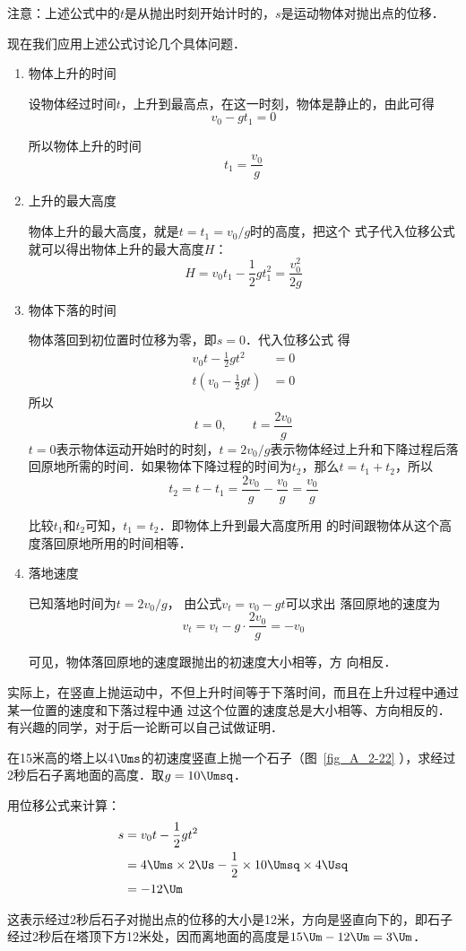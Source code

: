 注意：上述公式中的$t$是从抛出时刻开始计时的，$s$是运动物体对抛出点的位移．

现在我们应用上述公式讨论几个具体问题．
\begin{enumerate}[(1)]
	\item  物体上升的时间
	
	设物体经过时间$t$，上升到最高点，在这一时刻，物体是静止的，由此可得
	\[v_0-gt_1=0 \]
	
	所以物体上升的时间
	\[t_1=\frac{v_0}{g} \]
	
	\item 上升的最大高度
	
	物体上升的最大高度，就是$t=t_1=v_0/g$时的高度，把这个
	式子代入位移公式就可以得出物体上升的最大高度$H$：
	\[H=v_0t_1-\frac{1}{2}gt_1^2=\frac{v^2_0}{2g} \]
	
	\item 物体下落的时间
	
	物体落回到初位置时位移为零，即$s=0$．代入位移公式
	得
	\[\begin{split}
	v_0 t-\frac{1}{2}gt^2&=0\\
	t\left(v_0-\frac{1}{2}gt\right)&=0
	\end{split} \]
	所以
	\[t=0,\qquad t=\frac{2v_0}{g} \]
	$t=0$表示物体运动开始时的时刻，$t=2v_0/g$表示物体经过上升和下降过程后落回原地所需的时间．如果物体下降过程的时间为$t_2$，那么$t=t_1+t_2$，所以
	\[t_2=t-t_1=\frac{2v_0}{g}-\frac{v_0}{g}=\frac{v_0}{g} \]
	
	比较$t_1$和$t_2$可知，$t_1=t_2$．即物体上升到最大高度所用
	的时间跟物体从这个高度落回原地所用的时间相等．
	
	\item 落地速度
	
	已知落地时间为$t=2v_0/g$，
	由公式$v_t=v_0-gt$可以求出
	落回原地的速度为
	\[v_t=v_t-g\cdot \frac{2v_0}{g}=-v_0 \]
	
	可见，物体落回原地的速度跟抛出的初速度大小相等，方
	向相反．
\end{enumerate}

实际上，在竖直上抛运动中，不但上升时间等于下落时间，而且在上升过程中通过某一位置的速度和下落过程中通
过这个位置的速度总是大小相等、方向相反的．有兴趣的同学，对于后一论断可以自己试做证明．

\begin{example}
在15米高的塔上以4$\Ums$的初速度竖直上抛一个石子（图~\ref{fig_A_2-22} ），求经过2秒后石子离地面的高度．取$g=10\Umsq$．
\end{example}

\begin{solution}
用位移公式来计算：
\[\begin{split}
s&=v_0 t-\frac{1}{2}gt^2\\
&=4\Ums \times 2 \Us -\frac{1}{2}\times 10\Umsq \times 4 \Usq \\
&=-12 \Um
\end{split} \]

这表示经过2秒后石子对抛出点的位移的大小是12米，方向是竖直向下的，即石子经过2秒后在塔顶下方12米处，因而离地面的高度是$15 \Um -12 \Um=3 \Um$．
\end{solution}

